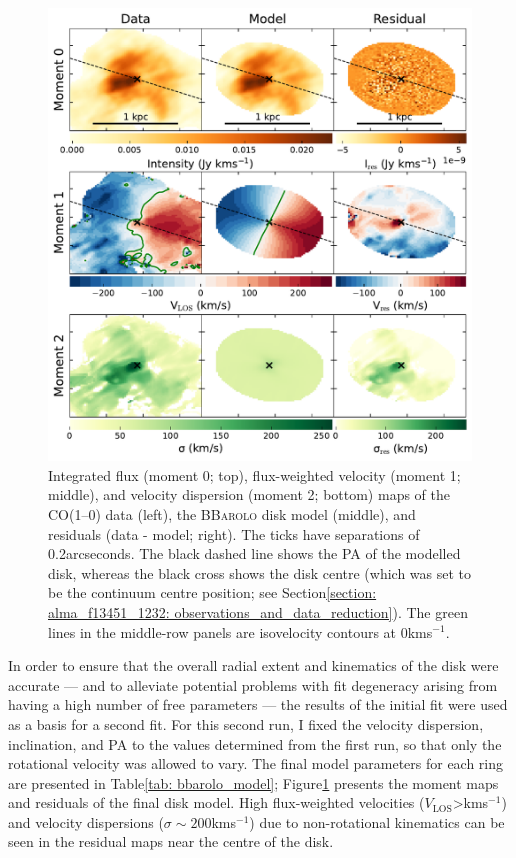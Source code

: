 \begin{figure}[!p]
    \centering
    \includegraphics[width=\linewidth]{figures/alma_f13451_1232/disk_moment_maps.pdf}
    \caption[Moment 0, 1, and 2 maps (and residuals = data - model) for the \textsc{BBarolo 3DFit} model of the kiloparsec-scale disk in the primary nucleus of F13451+1232.]{Integrated flux (moment 0; top), flux-weighted velocity (moment 1; middle), and velocity dispersion (moment 2; bottom) maps of the CO(1--0) data (left), the \textsc{BBarolo} disk model (middle), and residuals (data - model; right). The ticks have separations of 0.2\;arcseconds. The black dashed line shows the PA of the modelled disk, whereas the black cross shows the disk centre (which was set to be the continuum centre position; see Section\;\ref{section: alma_f13451_1232: observations_and_data_reduction}). The green lines in the middle-row panels are isovelocity contours at 0\;km\;s$^{-1}$.}
    \label{fig: alma_f13451_1232: bbarolo_model}
\end{figure}


In order to ensure that the overall radial extent and kinematics of the disk were accurate --- and to alleviate potential problems with fit degeneracy arising from having a high number of free parameters --- the results of the initial fit were used as a basis for a second fit. For this second run, I fixed the velocity dispersion, inclination, and PA to the values determined from the first run, so that only the rotational velocity was allowed to vary. The final model parameters for each ring are presented in Table\;\ref{tab: bbarolo_model}; Figure\;\ref{fig: alma_f13451_1232: bbarolo_model} presents the moment maps and residuals of the final disk model. High flux-weighted velocities ($V_\mathrm{LOS}$\;\textgreater{}\;km\;s$^{-1}$) and velocity dispersions ($\sigma\sim200$\;km\;s$^{-1}$) due to non-rotational kinematics can be seen in the residual maps near the centre of the disk.

